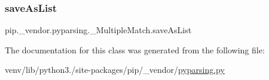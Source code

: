 \subsubsection{\texorpdfstring{save\+As\+List}{saveAsList}}
{\footnotesize\ttfamily pip.\+\_\+vendor.\+pyparsing.\+\_\+\+Multiple\+Match.\+save\+As\+List}



The documentation for this class was generated from the following file\+:\begin{DoxyCompactItemize}
\item 
venv/lib/python3./site-\/packages/pip/\+\_\+vendor/\hyperlink{pip_2__vendor_2pyparsing_8py}{pyparsing.\+py}\end{DoxyCompactItemize}
